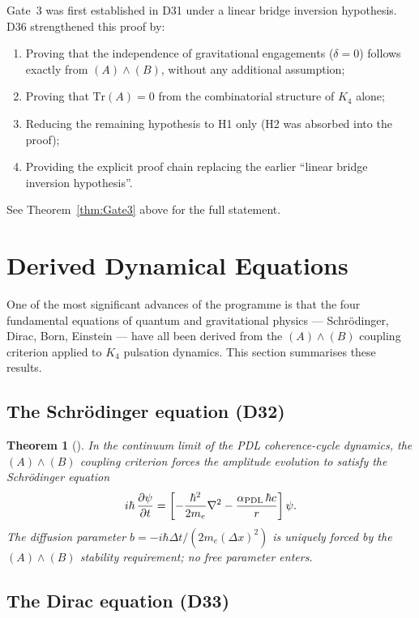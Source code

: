 \documentclass[11pt,a4paper]{article}
\theoremstyle{plain}
\newtheorem{theorem}{Theorem}[section]
\theoremstyle{definition}
\theoremstyle{remark}
\newcommand{\PDL}{\textnormal{PDL}}
\newcommand{\Kfour}{K_4}
\begin{document}
Gate~3 was first established in D31 under a linear bridge inversion hypothesis.
D36 strengthened this proof by:
\begin{enumerate}
\item Proving that the independence of gravitational engagements ($\delta=0$) follows exactly from $(A)\wedge(B)$, without any additional assumption;
\item Proving that $\mathrm{Tr}(A)=0$ from the combinatorial structure of $\Kfour$ alone;
\item Reducing the remaining hypothesis to H1 only (H2 was absorbed into the proof);
\item Providing the explicit proof chain replacing the earlier ``linear bridge inversion hypothesis''.
\end{enumerate}
See Theorem~\ref{thm:Gate3} above for the full statement.

\section{Derived Dynamical Equations}
\label{sec:dynamics}

One of the most significant advances of the programme is that the four fundamental equations of quantum and gravitational physics — Schr\"odinger, Dirac, Born, Einstein — have all been derived from the $(A)\wedge(B)$ coupling criterion applied to $\Kfour$ pulsation dynamics.
This section summarises these results.

\subsection{The Schr\"odinger equation (D32)}
\label{subsec:schrodinger}

\begin{theorem}[\citep{D32}]
\label{thm:Schrodinger}
In the continuum limit of the PDL coherence-cycle dynamics, the $(A)\wedge(B)$ coupling criterion forces the amplitude evolution to satisfy the Schr\"odinger equation
\[
i\hbar\,\frac{\partial\psi}{\partial t} = \left[-\frac{\hbar^2}{2m_e}\nabla^2 - \frac{\alpha_{\PDL}\,\hbar c}{r}\right]\psi.
\]
The diffusion parameter $b=-i\hbar\Delta t/(2m_e(\Delta x)^2)$ is uniquely forced by the $(A)\wedge(B)$ stability requirement; no free parameter enters.
\end{theorem}

\subsection{The Dirac equation (D33)}
\label{subsec:dirac}
\end{document}
